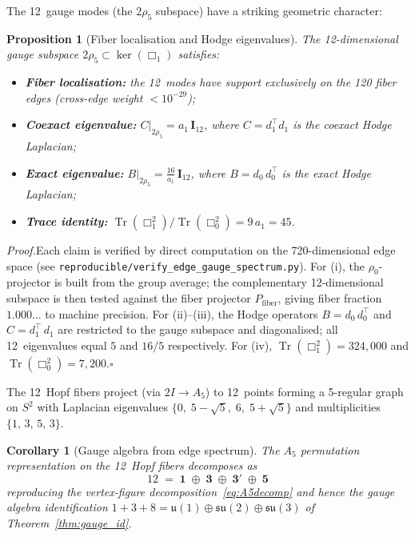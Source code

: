 \documentclass[12pt,a4paper]{article}
\newtheorem{proposition}{Proposition}
\newtheorem{corollary}{Corollary}
\theoremstyle{definition}
\begin{document}
The 12~gauge modes (the $2\rho_5$ subspace) have a striking geometric character:

\begin{proposition}[Fiber localisation and Hodge eigenvalues]\label{prop:fiber_local}
The 12-dimensional gauge subspace $2\rho_5 \subset \ker(\Box_1)$ satisfies:
\begin{itemize}
\item[\textup{(i)}] \textbf{Fiber localisation:} the 12~modes have support exclusively on the 120 fiber edges (cross-edge weight $< 10^{-29}$);
\item[\textup{(ii)}] \textbf{Coexact eigenvalue:} $C\big|_{2\rho_5} = a_1\, \mathbf{I}_{12}$, where $C = d_1^\top d_1$ is the coexact Hodge Laplacian;
\item[\textup{(iii)}] \textbf{Exact eigenvalue:} $B\big|_{2\rho_5} = \tfrac{16}{a_1}\, \mathbf{I}_{12}$, where $B = d_0\, d_0^\top$ is the exact Hodge Laplacian;
\item[\textup{(iv)}] \textbf{Trace identity:} $\operatorname{Tr}(\Box_1^2)\big/\operatorname{Tr}(\Box_0^2) = 9\,a_1 = 45$.
\end{itemize}
\end{proposition}

\noindent\textit{Proof.}\enspace Each claim is verified by direct computation on the 720-dimensional edge space (see \texttt{reproducible/verify\_edge\_gauge\_spectrum.py}).  For (i), the $\rho_0$-projector is built from the group average; the complementary 12-dimensional subspace is then tested against the fiber projector $P_{\text{fiber}}$, giving fiber fraction $1.000\ldots$ to machine precision.  For (ii)--(iii), the Hodge operators $B = d_0\,d_0^\top$ and $C = d_1^\top\,d_1$ are restricted to the gauge subspace and diagonalised; all 12~eigenvalues equal $5$ and $16/5$ respectively.  For (iv), $\operatorname{Tr}(\Box_1^2) = 324{,}000$ and $\operatorname{Tr}(\Box_0^2) = 7{,}200$.\hfill$\square$

\smallskip

The 12~Hopf fibers project (via $2I\!\to\!A_5$) to 12~points forming a 5-regular graph on $S^2$ with Laplacian eigenvalues $\{0,\; 5{-}\sqrt{5},\; 6,\; 5{+}\sqrt{5}\}$ and multiplicities $\{1,\,3,\,5,\,3\}$.

\begin{corollary}[Gauge algebra from edge spectrum]\label{cor:edge_gauge_algebra}
The $A_5$ permutation representation on the 12~Hopf fibers decomposes as
\begin{equation}
12 \;=\; \mathbf{1} \;\oplus\; \mathbf{3} \;\oplus\; \mathbf{3'} \;\oplus\; \mathbf{5}
\end{equation}
reproducing the vertex-figure decomposition~\eqref{eq:A5decomp} and hence the gauge algebra identification $1 + 3 + 8 = \mathfrak{u}(1) \oplus \mathfrak{su}(2) \oplus \mathfrak{su}(3)$ of Theorem~\textup{\ref{thm:gauge_id}}.
\end{corollary}
\end{document}
